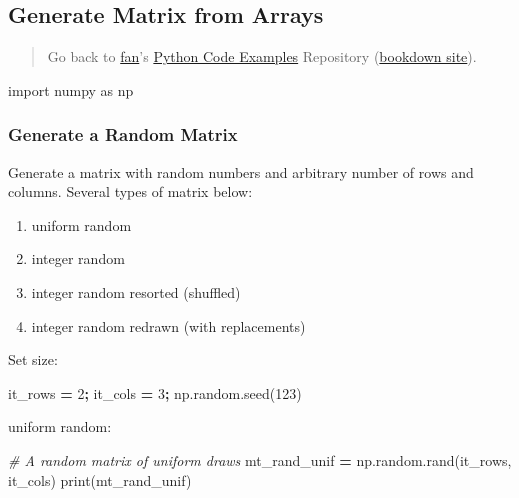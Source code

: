 \documentclass[
]{book}
\newenvironment{Shaded}{\begin{snugshade}}{\end{snugshade}}
\newcommand{\BuiltInTok}[1]{#1}
\newcommand{\CommentTok}[1]{\textcolor[rgb]{0.56,0.35,0.01}{\textit{#1}}}
\newcommand{\DecValTok}[1]{\textcolor[rgb]{0.00,0.00,0.81}{#1}}
\newcommand{\ImportTok}[1]{#1}
\newcommand{\NormalTok}[1]{#1}
\newcommand{\OperatorTok}[1]{\textcolor[rgb]{0.81,0.36,0.00}{\textbf{#1}}}
\providecommand{\tightlist}{%
  \setlength{\itemsep}{0pt}\setlength{\parskip}{0pt}}
\begin{document}
\hypertarget{generate-matrix-from-arrays}{%
\subsection{Generate Matrix from Arrays}\label{generate-matrix-from-arrays}}

\begin{quote}
Go back to \href{http://fanwangecon.github.io/}{fan}'s \href{https://fanwangecon.github.io/pyfan/}{Python Code Examples} Repository (\href{https://fanwangecon.github.io/pyfan/bookdown}{bookdown site}).
\end{quote}

\begin{Shaded}
\begin{Highlighting}[]
\ImportTok{import}\NormalTok{ numpy }\ImportTok{as}\NormalTok{ np}
\end{Highlighting}
\end{Shaded}

\hypertarget{generate-a-random-matrix}{%
\subsubsection{Generate a Random Matrix}\label{generate-a-random-matrix}}

Generate a matrix with random numbers and arbitrary number of rows and columns. Several types of matrix below:

\begin{enumerate}
\def\labelenumi{\arabic{enumi}.}
\tightlist
\item
  uniform random
\item
  integer random
\item
  integer random resorted (shuffled)
\item
  integer random redrawn (with replacements)
\end{enumerate}

Set size:

\begin{Shaded}
\begin{Highlighting}[]
\NormalTok{it\_rows }\OperatorTok{=} \DecValTok{2}\OperatorTok{;}
\NormalTok{it\_cols }\OperatorTok{=} \DecValTok{3}\OperatorTok{;}
\NormalTok{np.random.seed(}\DecValTok{123}\NormalTok{)}
\end{Highlighting}
\end{Shaded}

uniform random:

\begin{Shaded}
\begin{Highlighting}[]
\CommentTok{\# A random matrix of uniform draws}
\NormalTok{mt\_rand\_unif }\OperatorTok{=}\NormalTok{ np.random.rand(it\_rows, it\_cols)}
\BuiltInTok{print}\NormalTok{(mt\_rand\_unif)}
\end{Highlighting}
\end{Shaded}
\end{document}
